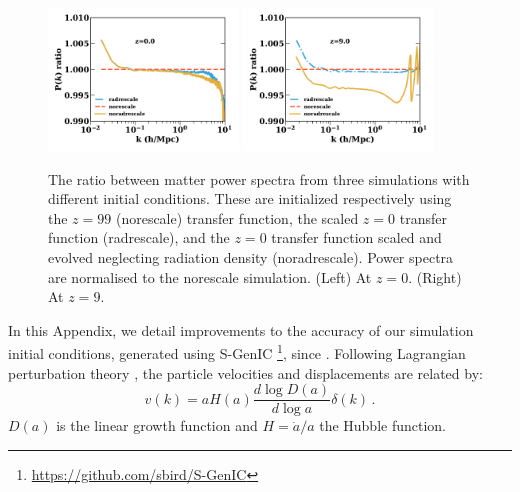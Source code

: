 \documentclass[useAMS, usenatbib]{mnras}
\begin{document}
\begin{figure}
\includegraphics[width=0.45\textwidth]{icplots/pks_rel-1.pdf}
\includegraphics[width=0.45\textwidth]{icplots/pks_rel-0_1.pdf}
  \caption{The ratio between matter power spectra from three simulations with different initial conditions.
  These are initialized respectively using the $z=99$ (norescale) transfer function,
  the scaled $z=0$ transfer function (radrescale), and the $z=0$ transfer function
  scaled and evolved neglecting radiation density (noradrescale). Power spectra are normalised to the norescale simulation.
  (Left) At $z=0$. (Right) At $z=9$.}
  \label{fig:rescaling}
\end{figure}

In this Appendix, we detail improvements to the accuracy of our simulation initial conditions, generated using S-GenIC \footnote{\url{https://github.com/sbird/S-GenIC}}, since \cite{AHB}.
Following Lagrangian perturbation theory \citep{Zeldovich_1970, Scoccimarro_1998}, 
the particle velocities and displacements are related by:
\begin{equation}
v(k) = a H(a) \frac{d \log D(a)}{d \log a} \delta(k)\,.
\label{eq:vel_prefac}
\end{equation}
$D(a)$ is the linear growth function and $H = \dot{a}/a$ the Hubble function.
\end{document}
